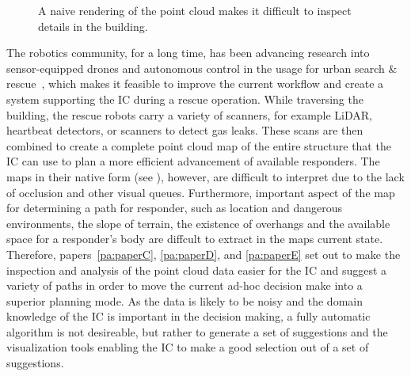 \begin{figure}
\centering
{}
\caption{A naive rendering of the point cloud makes it difficult to inspect details in the building.}
\label{contributions:usar:map:pointcloud}
\end{figure}

The robotics community, for a long time, has been advancing research into sensor-equipped drones and autonomous control in the usage for urban search \& rescue~\cite{liu2013robotic}, which makes it feasible to improve the current workflow and create a system supporting the IC during a rescue operation.  While traversing the building, the rescue robots carry a variety of scanners, for example LiDAR, heartbeat detectors, or scanners to detect gas leaks.  These scans are then combined to create a complete  point cloud map of the entire structure that the IC can use to plan a more efficient  advancement of available responders.  The maps in their native form (see ), however, are difficult to interpret due to the lack of occlusion and other visual queues.  Furthermore, important aspect of the map for determining a path for responder, such as location and dangerous environments, the slope of terrain, the existence of overhangs and the available space for a responder's body are diffcult to extract in the maps current state.  Therefore, papers~\ref{pa:paperC}, \ref{pa:paperD}, and \ref{pa:paperE} set out to make the inspection and analysis of the  point cloud data easier for the IC and suggest a variety of paths in order to move the current ad-hoc decision make into a superior planning mode.  As the data is likely to be noisy and the domain knowledge of the IC is important in the decision making, a fully automatic algorithm is not desireable, but rather to generate a set of suggestions and the visualization tools enabling the IC to make a good selection out of a set of suggestions.


